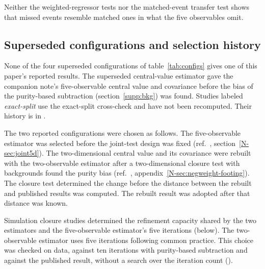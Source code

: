 Neither the weighted-regressor tests nor the matched-event transfer test shows that missed events resemble matched ones in what the five observables omit.

\subsection{Superseded configurations and selection history}
\label{supp:superseded}
None of the four superseded configurations of table~\ref{tab:configs} gives one of this paper's reported results. The superseded central-value estimator gave the companion note's five-observable central value and covariance before the bias of the purity-based subtraction (section~\ref{supp:bkg}) was found. Studies labeled \emph{exact-split} use the exact-split cross-check and have not been recomputed. Their history is in .

The two reported configurations were chosen as follows. The five-observable estimator was selected before the joint-test design was fixed (ref.~\cite{AnalysisNote2026}, section~\ref*{N-sec:joint5d}). The two-dimensional central value and its covariance were rebuilt with the two-observable estimator after a two-dimensional closure test with backgrounds found the purity bias (ref.~\cite{AnalysisNote2026}, appendix~\ref*{N-sec:negweight-footing}). The closure test determined the change before the distance between the rebuilt and published results was computed. The rebuilt result was adopted after that distance was known.

Simulation closure studies determined the refinement capacity shared by the two estimators and the five-observable estimator's five iterations (below). The two-observable estimator uses five iterations following common practice. This choice was checked on data, against ten iterations with purity-based subtraction and against the published result, without a search over the iteration count ().

